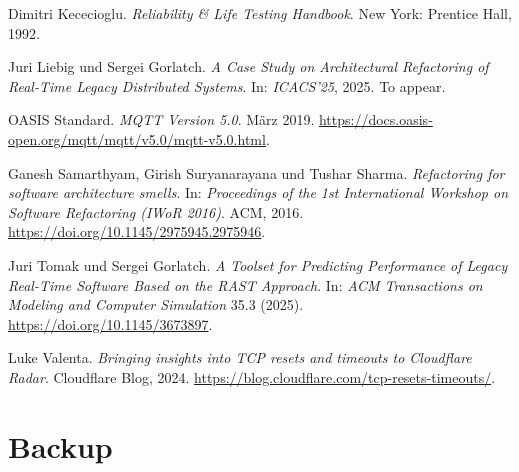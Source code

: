 \documentclass[11pt,aspectratio=1610]{beamer} %
\begin{document}
\begin{frame}
\begin{reflist}
        \hypertarget{Kec92}{}
        \item[{[Kec92]}] Dimitri Kececioglu. \textit{Reliability \& Life Testing Handbook}. New York: Prentice Hall, 1992.

        \hypertarget{LG25}{}
        \item[{[LG25]}] Juri Liebig und Sergei Gorlatch. \textit{A Case Study on Architectural Refactoring of Real-Time Legacy Distributed Systems}. In: \textit{ICACS'25}, 2025. To appear.

        \hypertarget{OAS19}{}
        \item[{[OAS19]}] OASIS Standard. \textit{MQTT Version 5.0}. März 2019. \url{https://docs.oasis-open.org/mqtt/mqtt/v5.0/mqtt-v5.0.html}.

        \hypertarget{SSS16}{}
        \item[{[SSS16]}] Ganesh Samarthyam, Girish Suryanarayana und Tushar Sharma. \textit{Refactoring for software architecture smells}. In: \textit{Proceedings of the 1st International Workshop on Software Refactoring (IWoR 2016)}. ACM, 2016. \url{https://doi.org/10.1145/2975945.2975946}.

        \hypertarget{TG25}{}
        \item[{[TG25]}] Juri Tomak und Sergei Gorlatch. \textit{A Toolset for Predicting Performance of Legacy Real-Time Software Based on the RAST Approach}. In: \textit{ACM Transactions on Modeling and Computer Simulation} 35.3 (2025). \url{https://doi.org/10.1145/3673897}.

        \hypertarget{Val24}{}
        \item[{[Val24]}] Luke Valenta. \textit{Bringing insights into TCP resets and timeouts to Cloudflare Radar}. Cloudflare Blog, 2024. \url{https://blog.cloudflare.com/tcp-resets-timeouts/}.

    \end{reflist}
\end{frame}

\makecontactpage[c]

\appendix
\section{Backup}
\end{document}
